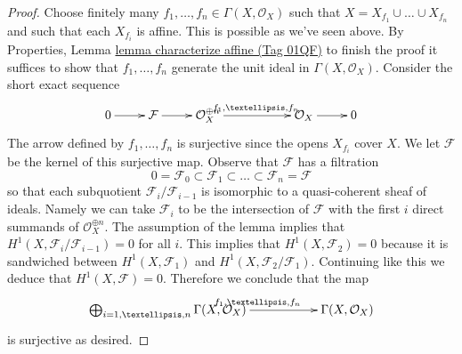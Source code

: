\documentclass{amsart}
\theoremstyle{plain}
\theoremstyle{definition}
\theoremstyle{remark}
\numberwithin{equation}{subsection}
\begin{document}
\begin{proof}
\medskip\noindent
Choose finitely many $f_1, \ldots, f_n \in \Gamma(X, \mathcal{O}_X)$
such that $X = X_{f_1} \cup \ldots \cup X_{f_n}$ and such that each
$X_{f_i}$ is affine. This is possible as we've seen above.
By Properties, Lemma \href{https://stacks.math.columbia.edu/tag/01QF}{lemma characterize affine (Tag 01QF)}
to finish the proof it suffices
to show that $f_1, \ldots, f_n$ generate the unit ideal in
$\Gamma(X, \mathcal{O}_X)$. Consider the short exact sequence
$$
\xymatrix{
0 \ar[r] &
\mathcal{F} \ar[r] &
\mathcal{O}_X^{\oplus n} \ar[rr]^{f_1, \ldots, f_n} & &
\mathcal{O}_X \ar[r] &
0
}
$$
The arrow defined by $f_1, \ldots, f_n$ is surjective since the
opens $X_{f_i}$ cover $X$. We let $\mathcal{F}$ be the kernel
of this surjective map.
Observe that $\mathcal{F}$ has a filtration
$$
0 = \mathcal{F}_0 \subset \mathcal{F}_1 \subset
\ldots \subset \mathcal{F}_n = \mathcal{F}
$$
so that each subquotient $\mathcal{F}_i/\mathcal{F}_{i - 1}$ is
isomorphic to a quasi-coherent sheaf of ideals.
Namely we can take $\mathcal{F}_i$ to be the intersection of
$\mathcal{F}$ with the first $i$ direct summands of
$\mathcal{O}_X^{\oplus n}$.
The assumption
of the lemma implies that $H^1(X, \mathcal{F}_i/\mathcal{F}_{i - 1}) = 0$
for all $i$. This implies that
$H^1(X, \mathcal{F}_2) = 0$ because it is sandwiched between
$H^1(X, \mathcal{F}_1)$ and $H^1(X, \mathcal{F}_2/\mathcal{F}_1)$.
Continuing like this we deduce that $H^1(X, \mathcal{F}) = 0$.
Therefore we conclude that the map
$$
\xymatrix{
\bigoplus\nolimits_{i = 1, \ldots, n} \Gamma(X, \mathcal{O}_X)
\ar[rr]^{f_1, \ldots, f_n} & &
\Gamma(X, \mathcal{O}_X)
}
$$
is surjective as desired.
\end{proof}
\end{document}
